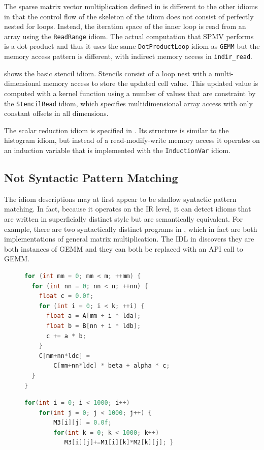 The sparse matrix vector multiplication defined in  is different to the other idioms in that
the control flow of the skeleton of the idiom does not consist of perfectly nested for loops.
Instead, the iteration space of the inner loop is read from an array using the \texttt{ReadRange} idiom.
The actual computation that SPMV performs is a dot product and thus it uses the same \texttt{DotProductLoop} idiom as
\texttt{GEMM} but the memory access pattern is different, with indirect memory access in \texttt{indir\_read}.

     shows the basic stencil idiom.
    Stencils consist of a loop nest with a multi-dimensional memory access to
    store the updated cell value.
    This updated value is computed with a kernel function using a number of
    values that are constraint by the
    \texttt{StencilRead} idiom, which specifies multidimensional array access
    with only constant offsets in all dimensions.

The scalar reduction idiom is specified in .
Its structure is similar to the histogram idiom, but instead of a read-modify-write memory access
it operates on an induction variable that is implemented with the \texttt{InductionVar} idiom.

\subsection{Not Syntactic Pattern Matching}
The idiom descriptions may at first appear to be shallow syntactic pattern matching.
In fact, because it operates on the IR level, it can detect idioms that are written in superficially distinct style but are semantically equivalent.
For example, there are two syntactically distinct programs in , which in fact are both implementations of general matrix multiplication.
The IDL in  discovers they are both instances of GEMM and they can both be replaced with an API call to GEMM.

\begin{figure}[ht]
\begin{lstlisting}[language=C]
for (int mm = 0; mm < m; ++mm) {
  for (int nn = 0; nn < n; ++nn) {
    float c = 0.0f;
    for (int i = 0; i < k; ++i) {
      float a = A[mm + i * lda]; 
      float b = B[nn + i * ldb];
      c += a * b;
    }
    C[mm+nn*ldc] =
        C[mm+nn*ldc] * beta + alpha * c;
  }
}
\end{lstlisting}
\begin{lstlisting}[language=C,label={fig:gemmexamples},caption=
   {Two matching instances of GEMM}]
for(int i = 0; i < 1000; i++)
    for(int j = 0; j < 1000; j++) {
        M3[i][j] = 0.0f;
        for(int k = 0; k < 1000; k++)
           M3[i][j]+=M1[i][k]*M2[k][j]; }
\end{lstlisting}
\end{figure}

